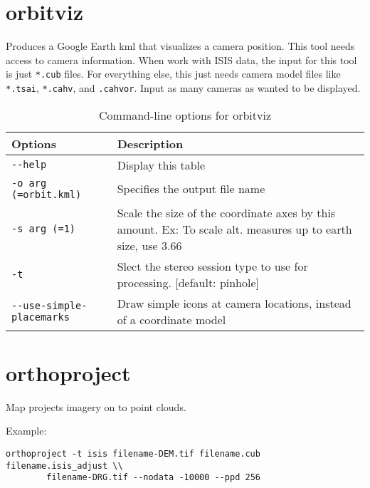 \section{orbitviz}
\label{orbitviz}

Produces a Google Earth kml that visualizes a camera position. This
tool needs access to camera information. When work with ISIS data, the
input for this tool is just \verb#*.cub# files. For everything else,
this just needs camera model files like \verb#*.tsai#, \verb#*.cahv#,
and \verb#.cahvor#. Input as many cameras as wanted to be displayed.

\begin{longtable}{|l|p{10cm}|}
\caption{Command-line options for orbitviz}
\label{tbl:orbitviz}
\endfirsthead
\endhead
\endfoot
\endlastfoot
\hline
Options & Description \\ \hline \hline
\verb#--help# & Display this table \\ \hline
\verb#-o arg (=orbit.kml)# & Specifies the output file name \\ \hline
\verb#-s arg (=1)# & Scale the size of the coordinate axes by this amount. Ex: To scale alt. measures up to earth size, use 3.66 \\ \hline
\verb#-t# & Slect the stereo session type to use for processing. [default: pinhole] \\ \hline
\verb#--use-simple-placemarks# & Draw simple icons at camera locations, instead of a coordinate model \\ \hline
\end{longtable}

\section{orthoproject}
\label{orthoproject}

Map projects imagery on to point clouds.

Example:
\begin{verbatim}
orthoproject -t isis filename-DEM.tif filename.cub filename.isis_adjust \\
        filename-DRG.tif --nodata -10000 --ppd 256
\end{verbatim}

